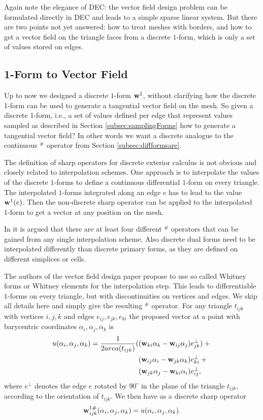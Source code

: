 Again note the elegance of DEC: the vector field design problem can be formulated directly in DEC and leads to a simple sparse linear system. But there are two points not yet answered: how to treat meshes with borders, and how to get a vector field on the triangle faces from a discrete $1$-form, which is only a set of values stored on edges.

\subsection{1-Form to Vector Field}
\label{sec:vf_1form2vf}
Up to now we designed a discrete $1$-form $\textbf{w}^1$, without clarifying how the discrete 1-form can be used to generate a tangential vector field on the mesh. So given a discrete  1-form, i.e., a set of values defined per edge that represent values sampled as described in Section  \ref{subsec:samplingForms} how to generate a tangential vector field? In other words we want a discrete analogue to the continuous $^\#$ operator from Section \ref{subsec:diffformsare}.

The definition of sharp operators for discrete exterior calculus is not obvious and closely related to interpolation schemes. One approach is to interpolate the values of the discrete $1$-forms to define a continuous differential $1$-form on every triangle. The interpolated $1$-forms integrated along an edge $e$ has to lead to the value $\textbf{w}^1(e)$. Then the non-discrete sharp operator can be applied to the interpolated 1-form to get a vector at any position on the mesh.

In \cite{hirani03} it is argued that there are at least four different $^\#$ operators that can be gained from any single interpolation scheme. Also discrete dual forms need to be interpolated differently than discrete primary forms, as they are defined on different simplices or cells. 

The authors of the vector field design paper \cite{vField} propose to use so called Whitney forms or Whitney elements for the interpolation step. This leads to differentiable $1$-forms on every triangle, but with discontinuities on vertices and edges. We skip all details here and simply give the resulting $^\#$ operator. For any triangle $t_{ijk}$ with vertices $i,j,k$ and edges $e_{ij}, e_{jk},e_{ki}$ the proposed vector at a point with barycentric coordinates $\alpha_i, \alpha_j, \alpha_k$ is
\begin{align} u(\alpha_i, \alpha_j, \alpha_k) = \frac{1}{2area(t_{ijk})} ( &(\textbf{w}_{ki} \alpha_k - \textbf{w}_{ij} \alpha_j)e_{jk}^\perp ) + {}\nonumber\\
&(\textbf{w}_{ij} \alpha_i - \textbf{w}_{jk} \alpha_k)e_{ki}^\perp + {}\nonumber\\ 
&(\textbf{w}_{jk} \alpha_j - \textbf{w}_{ki} \alpha_i)e_{ij}^\perp
\label{eq:vfSharp},
\end{align}
where $e^\perp$ denotes the edge $e$ rotated by $90^\circ$ in the plane of the triangle $t_{ijk}$, according to the orientation of $t_{ijk}$. We then have as a discrete sharp operator
$$\textbf{w}^{1\#}_{ijk}(\alpha_i, \alpha_j, \alpha_k) = u(\alpha_i, \alpha_j, \alpha_k).$$

